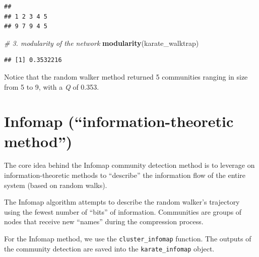 \documentclass[
]{book}
\newenvironment{Shaded}{\begin{snugshade}}{\end{snugshade}}
\newcommand{\AttributeTok}[1]{\textcolor[rgb]{0.13,0.29,0.53}{#1}}
\newcommand{\CommentTok}[1]{\textcolor[rgb]{0.56,0.35,0.01}{\textit{#1}}}
\newcommand{\DecValTok}[1]{\textcolor[rgb]{0.00,0.00,0.81}{#1}}
\newcommand{\FunctionTok}[1]{\textcolor[rgb]{0.13,0.29,0.53}{\textbf{#1}}}
\newcommand{\NormalTok}[1]{#1}
\newcommand{\OtherTok}[1]{\textcolor[rgb]{0.56,0.35,0.01}{#1}}
\newcommand{\SpecialCharTok}[1]{\textcolor[rgb]{0.81,0.36,0.00}{\textbf{#1}}}
\begin{document}
\begin{verbatim}
## 
## 1 2 3 4 5 
## 9 7 9 4 5
\end{verbatim}

\begin{Shaded}
\begin{Highlighting}[]
\CommentTok{\# 3. modularity of the network }
\FunctionTok{modularity}\NormalTok{(karate\_walktrap)  }
\end{Highlighting}
\end{Shaded}

\begin{verbatim}
## [1] 0.3532216
\end{verbatim}

Notice that the random walker method returned 5 communities ranging in size from 5 to 9, with a \emph{Q} of 0.353.

\section{Infomap (``information-theoretic method'')}\label{infomap-information-theoretic-method}

The core idea behind the Infomap community detection method is to leverage on information-theoretic methods to ``describe'' the information flow of the entire system (based on random walks).

The Infomap algorithm attempts to describe the random walker's trajectory using the fewest number of ``bits'' of information. Communities are groups of nodes that receive new ``names'' during the compression process.

For the Infomap method, we use the \texttt{cluster\_infomap} function. The outputs of the community detection are saved into the \texttt{karate\_infomap} object.

\begin{Shaded}
\end{Shaded}
\end{document}

